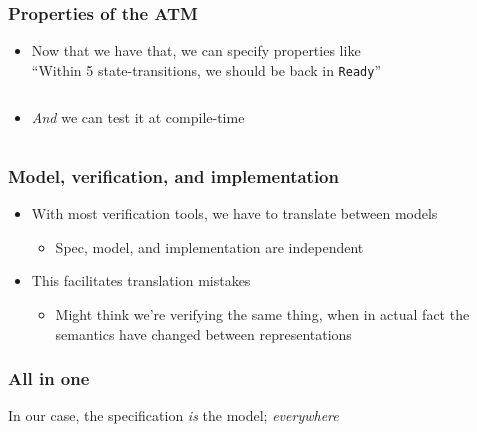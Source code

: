 \documentclass[compress,handout]{beamer}
\begin{document}
\begin{frame}
  \frametitle{Properties of the ATM}

  \begin{itemize}
    \item<1-> Now that we have that, we can specify properties like\\
              ``Within 5 state-transitions, we should be back in
              \texttt{Ready}''
              \vspace*{-1mm}
              \inputminted{Idris}{qc-things/ATM-props.idr}
    \item<2-> \textit{And} we can test it at compile-time
              \vspace*{-1mm}
              \inputminted{Idris}{qc-things/ATM-qc-props.idr}
              \vspace*{-3mm}
  \end{itemize}

\end{frame}


\begin{frame}[fragile]
  \frametitle{Model, verification, and implementation}
  \begin{itemize}
    \item<1-> With most verification tools, we have to translate between models
    \begin{itemize}
      \item<1-> Spec, model, and implementation are independent
    \end{itemize}
    \item<2-> This facilitates translation mistakes
    \begin{itemize}
      \item<2-> Might think we're verifying the same thing, when in actual fact
                the semantics have changed between representations
    \end{itemize}
  \end{itemize}

\end{frame}


\begin{frame}[fragile]
  \frametitle{All in one}

  
  In our case, the specification \textit{is} the model; \textit{everywhere}

  \inputminted[fontsize=\footnotesize]{Idris}{qc-things/ATM-arb-trace.idr}

\end{frame}
\end{document}

